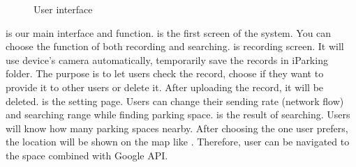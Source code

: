 \documentclass[runningheads,a4paper]{llncs}
\begin{document}
\begin{figure}[tbp]
{		\label{fig:userSetting}
	}
	\hspace{0.1in}
	\hspace{0.1in}
	\caption{User interface}
	\label{fig:userInterface}
\end{figure}

 is our main interface and function.
 is the first screen of the system. You
can choose the function of both recording and searching.
 is recording screen. It will use device's
camera automatically, temporarily save the records in iParking
folder. The purpose is to let users check the
record, choose if they want to provide it to other users or delete it. After
uploading the record, it will be deleted. 
is the setting page. Users can change their sending rate (network flow)
and searching range while finding parking space.
 is the result of searching. Users will know 
how many parking spaces nearby. After choosing the one user prefers, 
the location will be shown on the map like .
Therefore, user can be navigated to the space combined with Google API.
\end{document}
